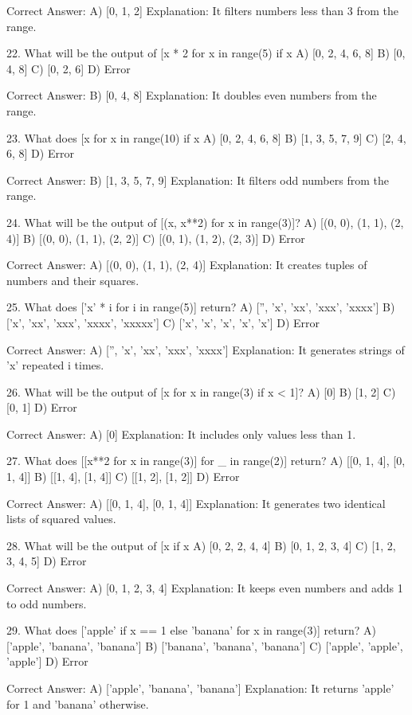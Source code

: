 Correct Answer: A) [0, 1, 2]
Explanation: It filters numbers less than 3 from the range.

22. What will be the output of [x * 2 for x in range(5) if x %
A) [0, 2, 4, 6, 8]
B) [0, 4, 8]
C) [0, 2, 6]
D) Error

Correct Answer: B) [0, 4, 8]
Explanation: It doubles even numbers from the range.

23. What does [x for x in range(10) if x %
A) [0, 2, 4, 6, 8]
B) [1, 3, 5, 7, 9]
C) [2, 4, 6, 8]
D) Error

Correct Answer: B) [1, 3, 5, 7, 9]
Explanation: It filters odd numbers from the range.

24. What will be the output of [(x, x**2) for x in range(3)]?
A) [(0, 0), (1, 1), (2, 4)]
B) [(0, 0), (1, 1), (2, 2)]
C) [(0, 1), (1, 2), (2, 3)]
D) Error

Correct Answer: A) [(0, 0), (1, 1), (2, 4)]
Explanation: It creates tuples of numbers and their squares.

25. What does ['x' * i for i in range(5)] return?
A) ['', 'x', 'xx', 'xxx', 'xxxx']
B) ['x', 'xx', 'xxx', 'xxxx', 'xxxxx']
C) ['x', 'x', 'x', 'x', 'x']
D) Error

Correct Answer: A) ['', 'x', 'xx', 'xxx', 'xxxx']
Explanation: It generates strings of 'x' repeated i times.

26. What will be the output of [x for x in range(3) if x < 1]?
A) [0]
B) [1, 2]
C) [0, 1]
D) Error

Correct Answer: A) [0]
Explanation: It includes only values less than 1.

27. What does [[x**2 for x in range(3)] for _ in range(2)] return?
A) [[0, 1, 4], [0, 1, 4]]
B) [[1, 4], [1, 4]]
C) [[1, 2], [1, 2]]
D) Error

Correct Answer: A) [[0, 1, 4], [0, 1, 4]]
Explanation: It generates two identical lists of squared values.

28. What will be the output of [x if x %
A) [0, 2, 2, 4, 4]
B) [0, 1, 2, 3, 4]
C) [1, 2, 3, 4, 5]
D) Error

Correct Answer: A) [0, 1, 2, 3, 4]
Explanation: It keeps even numbers and adds 1 to odd numbers.

29. What does ['apple' if x == 1 else 'banana' for x in range(3)] return?
A) ['apple', 'banana', 'banana']
B) ['banana', 'banana', 'banana']
C) ['apple', 'apple', 'apple']
D) Error

Correct Answer: A) ['apple', 'banana', 'banana']
Explanation: It returns 'apple' for 1 and 'banana' otherwise.

